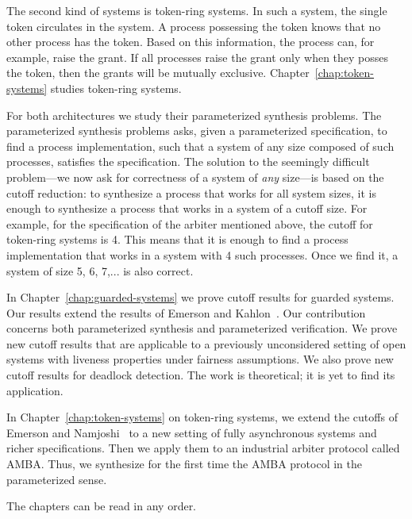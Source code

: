 The second kind of systems is token-ring systems.
In such a system, the single token circulates in the system.
A process possessing the token knows that no other process has the token.
Based on this information, the process can, for example, raise the grant.
If all processes raise the grant only when they posses the token,
then the grants will be mutually exclusive.
Chapter~\ref{chap:token-systems} studies token-ring systems.

For both architectures we study their parameterized synthesis problems.
The parameterized synthesis problems asks, given a parameterized specification,
to find a process implementation,
such that a system of any size composed of such processes,
satisfies the specification.
The solution to the seemingly difficult problem---we now ask for correctness of a system of \emph{any} size---is based on the cutoff reduction:
to synthesize a process that works for all system sizes,
it is enough to synthesize a process that works in a system of a cutoff size.
For example, for the specification of the arbiter mentioned above,
the cutoff for token-ring systems is 4.
This means that it is enough to find a process implementation that
works in a system with 4 such processes.
Once we find it, a system of size 5, 6, 7,... is also correct.

In Chapter~\ref{chap:guarded-systems} we prove cutoff results for guarded systems.
Our results extend the results of Emerson and Kahlon~\cite{EmersonK03}.
Our contribution concerns both parameterized synthesis and parameterized verification.
We prove new cutoff results that are applicable to a previously unconsidered setting
of open systems with liveness properties under fairness assumptions.
We also prove new cutoff results for deadlock detection.
The work is theoretical; it is yet to find its application.

In Chapter~\ref{chap:token-systems} on token-ring systems,
we extend the cutoffs of Emerson and Namjoshi~\cite{Emerso03}
to a new setting of fully asynchronous systems and richer specifications.
Then we apply them to an industrial arbiter protocol called AMBA.
Thus, we synthesize for the first time the AMBA protocol in the parameterized sense.

The chapters can be read in any order.




